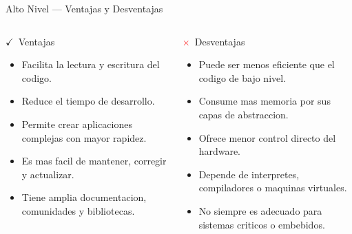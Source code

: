 \documentclass[10pt, aspectratio=169]{beamer}
\begin{document}
	\begin{frame}{Alto Nivel --- Ventajas y Desventajas}
		\begin{columns}
			\begin{block}{\textcolor{unemiNaranja}{$\checkmark$}\ Ventajas}
				\begin{itemize}
					\item Facilita la lectura y escritura del codigo.
					\item Reduce el tiempo de desarrollo.
					\item Permite crear aplicaciones complejas con mayor rapidez.
					\item Es mas facil de mantener, corregir y actualizar.
					\item Tiene amplia documentacion, comunidades y bibliotecas.
				\end{itemize}
			\end{block}
			
			\begin{block}{\textcolor{red}{$\times$}\ Desventajas}
				\begin{itemize}
					\item Puede ser menos eficiente que el codigo de bajo nivel.
					\item Consume mas memoria por sus capas de abstraccion.
					\item Ofrece menor control directo del hardware.
					\item Depende de interpretes, compiladores o maquinas virtuales.
					\item No siempre es adecuado para sistemas criticos o embebidos.
				\end{itemize}
			\end{block}
		\end{columns}
	\end{frame}
	
\end{document}
